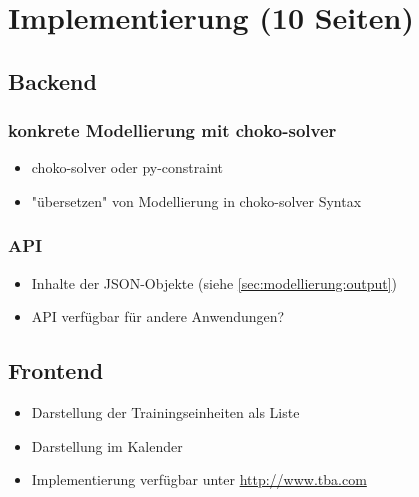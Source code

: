 \chapter{Implementierung (10 Seiten)}
\label{sec:implementierung} 
\section{Backend}
\subsection{konkrete Modellierung mit choko-solver}
\begin{itemize}
    \item choko-solver oder py-constraint
    \item "übersetzen" von Modellierung in choko-solver Syntax
\end{itemize}

\subsection{API}
\begin{itemize}
    \item Inhalte der JSON-Objekte (siehe \ref{sec:modellierung:output})
    \item API verfügbar für andere Anwendungen?
\end{itemize}

\section{Frontend}
\begin{itemize}
    \item Darstellung der Trainingseinheiten als Liste
    \item Darstellung im Kalender  
    \item Implementierung verfügbar unter \url{http://www.tba.com}
\end{itemize}
